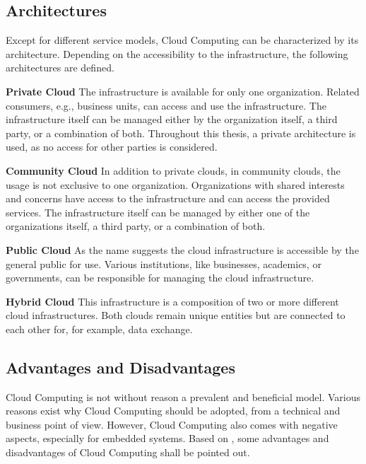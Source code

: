         
        \subsection{Architectures}
        \label{subsection:architecture}
            
            Except for different service models, Cloud Computing can be characterized by its architecture.
            Depending on the accessibility to the infrastructure, the following architectures are defined.
            
            \newpage
            \noindent \textbf{Private Cloud} 
            The infrastructure is available for only one organization.
            Related consumers, e.g., business units, can access and use the infrastructure.
            The infrastructure itself can be managed either by the organization itself, a third party, or a combination of both.
            Throughout this thesis, a private architecture is used, as no access for other parties is considered.
            
            \noindent \textbf{Community Cloud}
            In addition to private clouds, in community clouds, the usage is not exclusive to one organization.
            Organizations with shared interests and concerns have access to the infrastructure and can access the provided services.
            The infrastructure itself can be managed by either one of the organizations itself, a third party, or a combination of both.
            
            \noindent \textbf{Public Cloud}
            As the name suggests the cloud infrastructure is accessible by the general public for use.
            Various institutions, like businesses, academics, or governments, can be responsible for managing the cloud infrastructure.
            
            \noindent \textbf{Hybrid Cloud} 
            This infrastructure is a composition of two or more different cloud infrastructures.
            Both clouds remain unique entities but are connected to each other for, for example, data exchange.
            
        \subsection{Advantages and Disadvantages}
        \label{subsection:advantages_disadvantages}
            
            Cloud Computing is not without reason a prevalent and beneficial model.
            Various reasons exist why Cloud Computing should be adopted, from a technical and business point of view.
            However, Cloud Computing also comes with negative aspects, especially for embedded systems.
            Based on \cite{Alzahrani2014,Hallmans2015}, some advantages and disadvantages of Cloud Computing shall be pointed out.
            
